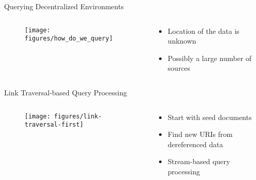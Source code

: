\begin{frame}{Querying Decentralized Environments}
    \begin{columns}[T] %
        \begin{column}{.48\textwidth}

       \begin{figure}
            \centering
            \texttt{[image: figures/how\_do\_we\_query]}
        \end{figure}

        \end{column}%
        \hfill%
        \begin{column}{.48\textwidth}
            \bigskip
            \begin{itemize}
                \item Location of the data is unknown
                \item Possibly a large number of sources
            \end{itemize}
        \end{column}%
    \end{columns}
\end{frame}

\begin{frame}{Link Traversal-based Query Processing}
    \begin{columns}[T] %
        \begin{column}{.48\textwidth}

       \begin{figure}
            \centering
            \texttt{[image: figures/link-traversal-first]}
        \end{figure}

        \end{column}%
        \hfill%
        \begin{column}{.48\textwidth}
            \bigskip
            \begin{itemize}
                \item Start with seed documents
                \item Find new URIs from dereferenced data
                \item Stream-based query processing
            \end{itemize}
        \end{column}%
    \end{columns}
\end{frame}


